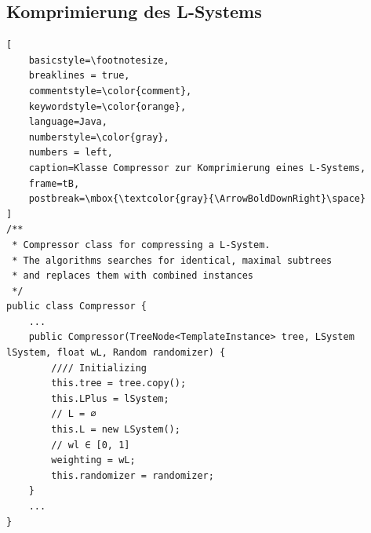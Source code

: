 \subsection*{Komprimierung des L-Systems}
\begin{lstlisting}[
    basicstyle=\footnotesize,
    breaklines = true,
    commentstyle=\color{comment},
    keywordstyle=\color{orange},
    language=Java,
    numberstyle=\color{gray},
    numbers = left,
    caption=Klasse Compressor zur Komprimierung eines L-Systems,
    frame=tB,
    postbreak=\mbox{\textcolor{gray}{\ArrowBoldDownRight}\space}
]
/**
 * Compressor class for compressing a L-System.
 * The algorithms searches for identical, maximal subtrees
 * and replaces them with combined instances
 */
public class Compressor {
    ...
    public Compressor(TreeNode<TemplateInstance> tree, LSystem lSystem, float wL, Random randomizer) {
        //// Initializing
        this.tree = tree.copy();
        this.LPlus = lSystem;
        // L = ∅
        this.L = new LSystem();
        // wl ∈ [0, 1]
        weighting = wL;
        this.randomizer = randomizer;
    }
    ...
}
\end{lstlisting}
